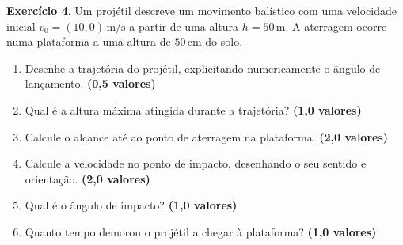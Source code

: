 \documentclass[12pt]{article}
\newcommand{\pontos}[1]{\hfill\textbf{(#1 valores)}}
\begin{document}
	\vspace{1.5cm}
	
	\textbf{Exercício 4}. Um projétil descreve um movimento balístico com uma velocidade inicial $\overline{v}_0 = (10, 0)\,\text{m/s}$ a partir de uma altura $h = 50\,\text{m}$. A aterragem ocorre numa plataforma a uma altura de $50\,\text{cm}$ do solo.
	\begin{enumerate}[label=\alph*)]
		\item Desenhe a trajetória do projétil, explicitando numericamente o ângulo de lançamento. \pontos{0,5}
		\item Qual é a altura máxima atingida durante a trajetória? \pontos{1,0}
		\item Calcule o alcance até ao ponto de aterragem na plataforma. \pontos{2,0}
		\item Calcule a velocidade no ponto de impacto, desenhando o seu sentido e orientação. \pontos{2,0}
		\item Qual é o ângulo de impacto? \pontos{1,0}
		\item Quanto tempo demorou o projétil a chegar à plataforma? \pontos{1,0}
	\end{enumerate}
	
\end{document}
